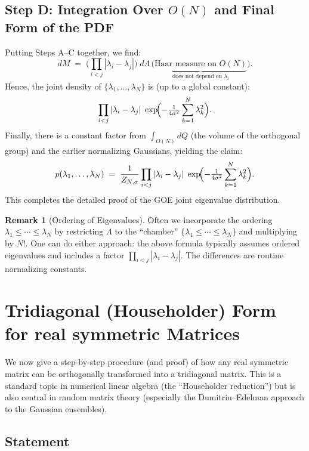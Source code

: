 \documentclass[letterpaper,11pt,oneside,reqno]{article}
\numberwithin{equation}{section}
\theoremstyle{definition}
\newtheorem{remark}[proposition]{Remark}
\begin{document}
\subsection{Step D: Integration Over \(O(N)\) and Final Form of the PDF}
\label{subsec:final-form}

Putting Steps A--C together, we find:
\[
  dM
  \;=\;
  \biggl(\prod_{i<j}|\lambda_i-\lambda_j|\biggr)\;
  d\Lambda
  \,\bigl(\underbrace{\text{Haar measure on }O(N)}_{\text{does not depend on }\lambda_i}\bigr).
\]
Hence, the joint density of \(\{\lambda_1,\dots,\lambda_N\}\) is (up to a global constant):
\[
  \prod_{i<j}|\lambda_i-\lambda_j|\;
  \exp\!\Bigl(-\tfrac{1}{4\sigma^2}\sum_{k=1}^N \lambda_k^2\Bigr).
\]
Finally, there is a constant factor from \(\int_{O(N)} dQ\) (the volume of the orthogonal group) and the earlier normalizing Gaussians, yielding the claim:
\[
  p(\lambda_1,\dots,\lambda_N)
  \;=\;
  \frac{1}{Z_{N,\sigma}}
  \prod_{i<j}|\lambda_i-\lambda_j|\;
  \exp\!\Bigl(-\tfrac{1}{4\sigma^2}\sum_{k=1}^N \lambda_k^2\Bigr).
\]
This completes the detailed proof of the GOE joint eigenvalue distribution.

\begin{remark}[Ordering of Eigenvalues]
Often we incorporate the ordering \(\lambda_1\le\cdots\le \lambda_N\) by restricting \(\Lambda\) to the “chamber” \(\{\lambda_1\le\cdots\le\lambda_N\}\) and multiplying by \(N!\).  One can do either approach: the above formula typically assumes ordered eigenvalues and includes a factor \(\prod_{i<j}|\lambda_i-\lambda_j|\).  The differences are routine normalizing constants.
\end{remark}

\section{Tridiagonal (Householder) Form for real symmetric Matrices}
\label{sec:householder}

We now give a step-by-step procedure (and proof) of how any real symmetric matrix can be orthogonally transformed into a tridiagonal matrix. This is a standard topic in numerical linear algebra (the “Householder reduction”) but is also central in random matrix theory (especially the Dumitriu–Edelman approach to the Gaussian ensembles).

\subsection{Statement}
\end{document}
